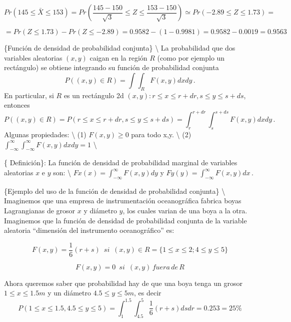 \documentclass[
]{agujournal2019}
\begin{document}
\[Pr(145 \le \bar{X} \le 153) =
      Pr\left( \frac{145-150}{\sqrt{3}} \le Z \le \frac{153-150}{\sqrt{3}}\right)
       \simeq Pr(-2.89 \le Z \le 1.73)=\]

\[=Pr(Z \le 1.73)- Pr(Z \le -2.89)=0.9582-(1-0.9981)=0.9582-0.0019=0.9563\]

\vspace{0.5cm}

\{\noindent  Función de densidad de probabilidad conjunta\}
\textbackslash{} La probabilidad que dos variables aleatorias \((x,y)\)
caigan en la región \(R\) (como por ejemplo un rectángulo) se obtiene
integrando su función de probabilidad conjunta
\[P((x,y)\in R)=\int\int_{R} F(x,y) dx dy\,.\] En particular, si \(R\)
es un rectángulo 2d \({(x,y):r\le x \le r+dr, s \le y \le s+ds}\),
entonces
\[P((x,y)\in R)=P(r\le x \le r+dr, s \le y \le s+ds)=\int^{r+dr}_r\int^{s+ds}_{s} F(x,y) dx dy\,.\]
Algunas propiedades: \textbackslash{} (1) \(F(x,y)\ge0\) para todo x,y.
\textbackslash{} (2)
\(\int^{\infty}_{-\infty}\int^{\infty}_{-\infty} F(x,y) dx dy=1\)
\textbackslash{}

\{ Definición\}: La función de densidad de probabilidad marginal de
variables aleatorias \(x\) e \(y\) son: \textbackslash{}
\(Fx(x)=\int^{\infty}_{-\infty} F(x,y)dy\) y
\(Fy(y)=\int^{\infty}_{-\infty} F(x,y)dx\,.\)

\vspace{0.5cm}

\{\noindent  Ejemplo del uso de la función de densidad de probabilidad
conjunta\} \textbackslash{} Imaginemos que una empresa de
instrumentación oceanográfica fabrica boyas Lagrangianas de grosor \(x\)
y diámetro \(y\), los cuales varian de una boya a la otra. Imaginemos
que la función de densidad de probabilidad conjunta de la variable
aleatoria ``dimensión del instrumento oceanográfico'' es:

\[F(x,y)=\frac{1}{6}(r+s)\,\,\,si\,\,\,(x,y)\in R=\{1\le x \le 2 ; 4 \le y \le 5\}\]

\[F(x,y)=0\,\,\,si\,\,\,(x,y)\,fuera\,de\,R\]

Ahora queremos saber que probabilidad hay de que una boya tenga un
grosor \(1 \le x \le 1.5m\) y un diámetro \(4.5 \le y \le 5m\), es decir
\[P(1 \le x \le 1.5, 4.5 \le y \le 5)=\int^{1.5}_{1} \int^{5}_{4.5} \frac{1}{6}(r+s) ds dr = 0.253= 25\%\]

\vspace{0.5cm}
\end{document}
